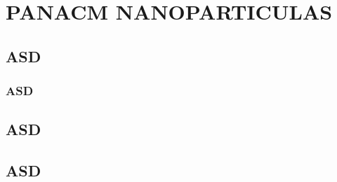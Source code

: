 
\chapter{PANACM NANOPARTICULAS} %

\label{C4} %



\section{ASD}



\subsection{ASD}



\section{ASD}



\section{ASD}